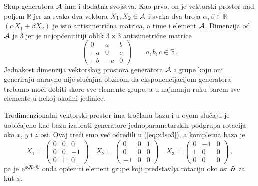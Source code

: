 Skup generatora $\mathcal{A}$ ima i dodatna svojstva. Kao prvo, on je
vektorski prostor nad poljem $\mathbb{R}$ jer za svaka dva vektora
$X_1, X_2\in\mathcal{A}$ i svaka dva broja $\alpha, \beta\in\mathbb{R}$ 
$(\alpha X_1 + \beta X_2)$ je isto antisimetrična matrica, a time i
element $\mathcal{A}$. Dimenzija od $\mathcal{A}$ je 3 jer je najopćenititiji
oblik $3\times 3$ antisimetrične matrice
\begin{equation}
    \begin{pmatrix}
        0 &  a  &  b \\
       -a &  0  &  c \\
       -b & -c  &  0
   \end{pmatrix}  \qquad   a, b, c \in \mathbb{R} \,.
\end{equation}
Jednakost dimenzija vektorskog prostora generatora $\mathcal{A}$ i grupe  koju
oni generiraju naravno nije slučajna obzirom da eksponencijacijom
generatora trebamo moći dobiti skoro sve elemente grupe, a u najmanju ruku
barem sve elemente u nekoj okolini jedinice. 

Trodimenzionalni vektorski prostor ima tročlanu bazu i u ovom slučaju je
uobičajeno kao bazu izabrati generatore jednoparametarskih podgrupa rotacija oko
$x$, $y$ i $z$ osi. Ovaj treći smo već odredili u (\ref{eq:x3so3}), a kompletna
baza je  
\begin{equation}
X_1=
\begin{pmatrix}
0 & 0 & 0 \\ 
0 & 0 &-1 \\
0 & 1 & 0
\end{pmatrix}  \quad
X_2=
\begin{pmatrix}
0 & 0 & 1 \\ 
0 & 0 & 0 \\
-1& 0 & 0
\end{pmatrix}  \quad
X_3=
\begin{pmatrix}
0 & -1 & 0 \\ 
1& 0 & 0 \\
0 & 0 & 0
\end{pmatrix} \,,
\label{eq:SO3generators}
\end{equation}
pa je $\rme^{\phi \vec{X}\cdot\unitn}$ onda općeniti element grupe  koji
predstavlja rotaciju oko osi $\unitn$ za kut $\phi$.

